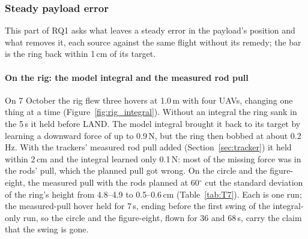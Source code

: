 
\subsubsection{Steady payload error}
\label{sec:res_steady}

This part of RQ1 asks what leaves a steady error in the payload's position and what removes it, each source against
the same flight without its remedy; the bar is the ring back within 1\,cm of its target.

\paragraph{On the rig: the model integral and the measured rod pull}
\label{sec:res_rig_integral}

On 7 October the rig flew three hovers at 1.0\,m with four UAVs, changing one thing at a time
(Figure~\ref{fig:rig_integral}). Without an integral the ring sank in the 5\,s it held before LAND. The model
integral brought it back to its target by learning a downward force of up to 0.9\,N, but the ring then bobbed
at about 0.2\,Hz. With the trackers' measured rod pull added (Section~\ref{sec:tracker}) it held within 2\,cm
and the integral learned only 0.1\,N: most of the missing force was in the rods' pull, which the planned pull
got wrong. On the circle and the figure-eight, the measured pull with the rods planned at 60$^\circ$ cut the
standard deviation of the ring's height from 4.8--4.9 to 0.5--0.6\,cm (Table~\ref{tab:T7}). Each is one run; the
measured-pull hover held for 7\,s, ending before the first swing of the integral-only run, so the circle and the
figure-eight, flown for 36 and 68\,s, carry the claim that the swing is gone.

